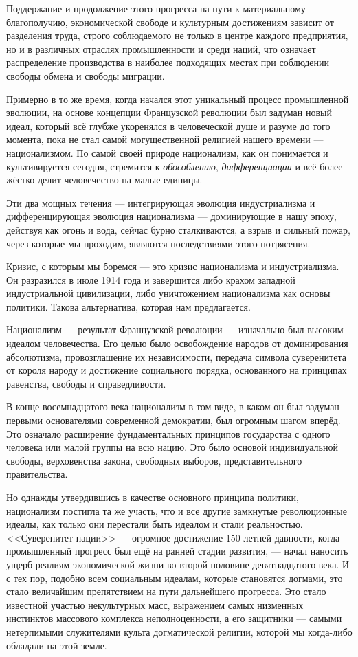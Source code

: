 Поддержание и продолжение этого прогресса на пути к материальному благополучию, экономической свободе и культурным достижениям зависит от разделения труда, строго соблюдаемого не только в центре каждого предприятия, но и в различных отраслях промышленности и среди наций, что означает распределение производства в наиболее подходящих местах при соблюдении свободы обмена и свободы миграции.

Примерно в то же время, когда начался этот уникальный процесс промышленной эволюции, на основе концепции Французской революции был задуман новый идеал, который всё глубже укоренялся в человеческой душе и разуме до того момента, пока не стал самой могущественной религией нашего времени — национализмом. По самой своей природе национализм, как он понимается и культивируется сегодня, стремится к \textit{обособлению}, \textit{дифференциации} и всё более жёстко делит человечество на малые единицы.

Эти два мощных течения — интегрирующая эволюция индустриализма и дифференцирующая эволюция национализма — доминирующие в нашу эпоху, действуя как огонь и вода, сейчас бурно сталкиваются, а взрыв и сильный пожар, через которые мы проходим, являются последствиями этого потрясения.

Кризис, с которым мы боремся — это кризис национализма и индустриализма. Он разразился в июле 1914 года и завершится либо крахом западной индустриальной цивилизации, либо уничтожением национализма как основы политики. Такова альтернатива, которая нам предлагается.

Национализм — результат Французской революции — изначально был высоким идеалом человечества. Его целью было освобождение народов от доминирования абсолютизма, провозглашение их независимости, передача символа суверенитета от короля народу и достижение социального порядка, основанного на принципах равенства, свободы и справедливости.

В конце восемнадцатого века национализм в том виде, в каком он был задуман первыми основателями современной демократии, был огромным шагом вперёд. Это означало расширение фундаментальных принципов государства с одного человека или малой группы на всю нацию. Это было основой индивидуальной свободы, верховенства закона, свободных выборов, представительного правительства.

Но однажды утвердившись в качестве основного принципа политики, национализм постигла та же участь, что и все другие замкнутые революционные идеалы, как только они перестали быть идеалом и стали реальностью. <<Суверенитет нации>> — огромное достижение 150-летней давности, когда промышленный прогресс был ещё на ранней стадии развития, — начал наносить ущерб реалиям экономической жизни во второй половине девятнадцатого века. И с тех пор, подобно всем социальным идеалам, которые становятся догмами, это стало величайшим препятствием на пути дальнейшего прогресса. Это стало известной участью некультурных масс, выражением самых низменных инстинктов массового комплекса неполноценности, а его защитники — самыми нетерпимыми служителями культа догматической религии, которой мы когда-либо обладали на этой земле.

